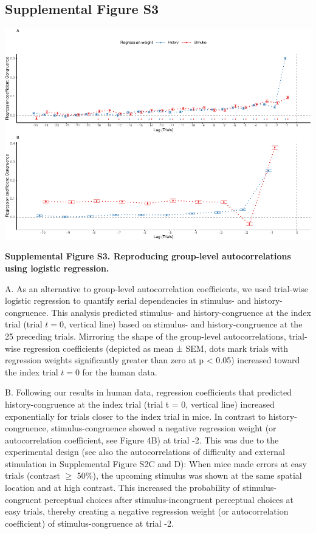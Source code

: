 \documentclass[
]{article}
\begin{document}
\newpage

\hypertarget{supplemental-figure-s3}{%
\subsection{Supplemental Figure S3}\label{supplemental-figure-s3}}

\includegraphics{modes_mouse_files/figure-latex/Supplememtal_Figure_S3-1.pdf}

\textbf{Supplemental Figure S3. Reproducing group-level autocorrelations
using logistic regression.}

A. As an alternative to group-level autocorrelation coefficients, we
used trial-wise logistic regression to quantify serial dependencies in
stimulus- and history-congruence. This analysis predicted stimulus- and
history-congruence at the index trial (trial \(t = 0\), vertical line)
based on stimulus- and history-congruence at the 25 preceding trials.
Mirroring the shape of the group-level autocorrelations, trial-wise
regression coefficients (depicted as mean ± SEM, dots mark trials with
regression weights significantly greater than zero at p \textless{}
0.05) increased toward the index trial \(t = 0\) for the human data.

B. Following our results in human data, regression coefficients that
predicted history-congruence at the index trial (trial t = 0, vertical
line) increased exponentially for trials closer to the index trial in
mice. In contrast to history-congruence, stimulus-congruence showed a
negative regression weight (or autocorrelation coefficient, see Figure
4B) at trial -2. This was due to the experimental design (see also the
autocorrelations of difficulty and external stimulation in Supplemental
Figure S2C and D): When mice made errors at easy trials (contrast
\(\geq\) 50\%), the upcoming stimulus was shown at the same spatial
location and at high contrast. This increased the probability of
stimulus-congruent perceptual choices after stimulus-incongruent
perceptual choices at easy trials, thereby creating a negative
regression weight (or autocorrelation coefficient) of
stimulus-congruence at trial -2.
\end{document}
